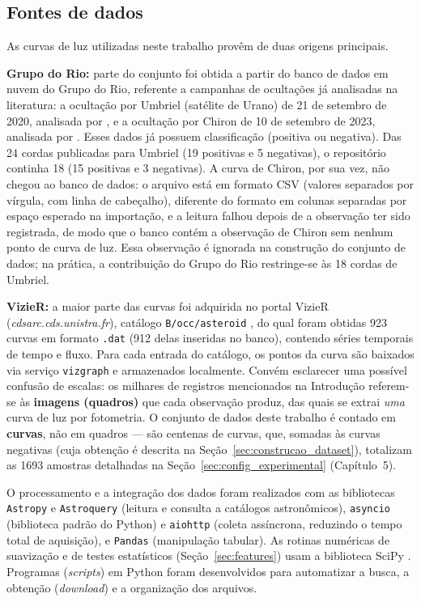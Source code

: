 \subsection{Fontes de dados}

As curvas de luz utilizadas neste trabalho provêm de duas origens principais.

\textbf{Grupo do Rio:} parte do conjunto foi obtida a partir do banco de dados em nuvem do Grupo do Rio, referente a campanhas de ocultações já analisadas na literatura: a ocultação por Umbriel (satélite de Urano) de 21 de setembro de 2020, analisada por \cite{Umbriel2020}, e a ocultação por Chiron de 10 de setembro de 2023, analisada por \cite{Chiron2025}. Esses dados já possuem classificação (positiva ou negativa). Das 24 cordas publicadas para Umbriel (19 positivas e 5 negativas), o repositório continha 18 (15 positivas e 3 negativas). A curva de Chiron, por sua vez, não chegou ao banco de dados: o arquivo está em formato CSV (valores separados por vírgula, com linha de cabeçalho), diferente do formato em colunas separadas por espaço esperado na importação, e a leitura falhou depois de a observação ter sido registrada, de modo que o banco contém a observação de Chiron sem nenhum ponto de curva de luz. Essa observação é ignorada na construção do conjunto de dados; na prática, a contribuição do Grupo do Rio restringe-se às 18 cordas de Umbriel.

\textbf{VizieR:} a maior parte das curvas foi adquirida no portal VizieR (\textit{cdsarc.cds.unistra.fr}), catálogo \texttt{B/occ/asteroid} \citep{HeraldBocc2016}, do qual foram obtidas 923 curvas em formato \texttt{.dat} (912 delas inseridas no banco), contendo séries temporais de tempo e fluxo. Para cada entrada do catálogo, os pontos da curva são baixados via serviço \texttt{vizgraph} e armazenados localmente. Convém esclarecer uma possível confusão de escalas: os milhares de registros mencionados na Introdução referem-se às \textbf{imagens (quadros)} que cada observação produz, das quais se extrai \emph{uma} curva de luz por fotometria. O conjunto de dados deste trabalho é contado em \textbf{curvas}, não em quadros --- são centenas de curvas, que, somadas às curvas negativas (cuja obtenção é descrita na Seção~\ref{sec:construcao_dataset}), totalizam as 1693 amostras detalhadas na Seção~\ref{sec:config_experimental} (Capítulo~5).

O processamento e a integração dos dados foram realizados com as bibliotecas \texttt{Astropy} \citep{Astropy2022} e \texttt{Astroquery} \citep{Astroquery2019} (leitura e consulta a catálogos astronômicos), \texttt{asyncio} (biblioteca padrão do Python) e \texttt{aiohttp} (coleta assíncrona, reduzindo o tempo total de aquisição), e \texttt{Pandas} \citep{McKinney2010} (manipulação tabular). As rotinas numéricas de suavização e de testes estatísticos (Seção~\ref{sec:features}) usam a biblioteca SciPy \citep{SciPy2020}. Programas (\textit{scripts}) em Python foram desenvolvidos para automatizar a busca, a obtenção (\textit{download}) e a organização dos arquivos.

